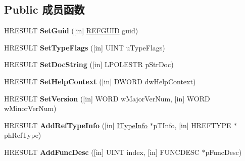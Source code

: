 \subsection*{Public 成员函数}
\begin{DoxyCompactItemize}
\item 
\mbox{\label{interface_i_create_type_info_a0e45c6d5b498090310d1391b586bce3a}} 
H\+R\+E\+S\+U\+LT {\bfseries Set\+Guid} (\mbox{[}in\mbox{]} \hyperlink{struct___g_u_i_d}{R\+E\+F\+G\+U\+ID} guid)
\item 
\mbox{\label{interface_i_create_type_info_ab6bd7c3530b4ed14a83d21392d72f752}} 
H\+R\+E\+S\+U\+LT {\bfseries Set\+Type\+Flags} (\mbox{[}in\mbox{]} U\+I\+NT u\+Type\+Flags)
\item 
\mbox{\label{interface_i_create_type_info_a7567856f40e2e4eb084573894803e3e4}} 
H\+R\+E\+S\+U\+LT {\bfseries Set\+Doc\+String} (\mbox{[}in\mbox{]} L\+P\+O\+L\+E\+S\+TR p\+Str\+Doc)
\item 
\mbox{\label{interface_i_create_type_info_a60e7214c11348189bd70adefc68eb8da}} 
H\+R\+E\+S\+U\+LT {\bfseries Set\+Help\+Context} (\mbox{[}in\mbox{]} D\+W\+O\+RD dw\+Help\+Context)
\item 
\mbox{\label{interface_i_create_type_info_afa6b41a6c44c76055ccb6b05e841cb9e}} 
H\+R\+E\+S\+U\+LT {\bfseries Set\+Version} (\mbox{[}in\mbox{]} W\+O\+RD w\+Major\+Ver\+Num, \mbox{[}in\mbox{]} W\+O\+RD w\+Minor\+Ver\+Num)
\item 
\mbox{\label{interface_i_create_type_info_a7da0544b2f98acff51e407a5d7feccd5}} 
H\+R\+E\+S\+U\+LT {\bfseries Add\+Ref\+Type\+Info} (\mbox{[}in\mbox{]} \hyperlink{interface_i_type_info}{I\+Type\+Info} $\ast$p\+T\+Info, \mbox{[}in\mbox{]} H\+R\+E\+F\+T\+Y\+PE $\ast$ph\+Ref\+Type)
\item 
\mbox{\label{interface_i_create_type_info_a926e50521d9ac960eb1179ff0a5bbe7c}} 
H\+R\+E\+S\+U\+LT {\bfseries Add\+Func\+Desc} (\mbox{[}in\mbox{]} U\+I\+NT index, \mbox{[}in\mbox{]} F\+U\+N\+C\+D\+E\+SC $\ast$p\+Func\+Desc)
\item 

\end{DoxyCompactItemize}
